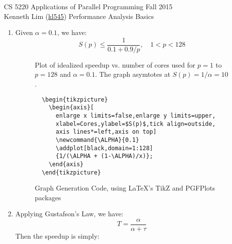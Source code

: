 \documentclass{scrartcl}
\begin{document}
  \begin{framed}
  \large
  CS 5220 Applications of Parallel Programming \hfill Fall 2015 \\
  Kenneth Lim (\href{mailto:kl545@cornell.edu}{kl545}) \hfill Performance Analysis Basics \hspace{-3ex}
  \end{framed}
  \begin{enumerate}
    \item Given $\alpha = 0.1$, we have:
    \[
      S(p) \leq \frac{1}{0.1 + 0.9/p},\quad 1<p<128
    \]
    \begin{figure}[p]
      \centering
    \caption{Plot of idealized speedup vs. number of cores used for $p = 1$ to $p = 128$ and $\alpha = 0.1$. The graph asymtotes at $S(p) = 1/\alpha = 10$.\label{fig:amdahl}}
    \end{figure}
    \begin{figure}[p]
\begin{lstlisting}
  \begin{tikzpicture}
    \begin{axis}[
      enlarge x limits=false,enlarge y limits=upper,
      xlabel=Cores,ylabel=$S(p)$,tick align=outside,
      axis lines*=left,axis on top]
      \newcommand{\ALPHA}{0.1}
      \addplot[black,domain=1:128]
      {1/(\ALPHA + (1-\ALPHA)/x)};
    \end{axis}
  \end{tikzpicture}
\end{lstlisting}
    \caption{Graph Generation Code, using \LaTeX's TikZ and PGFPlots packages\label{code:amdahl}}
    \end{figure}
    \item Applying Gustafson's Law, we have:
    \[
      T = \frac{\alpha}{\alpha + \tau}
    \]
    Then the speedup is simply:

\end{enumerate}
\end{document}
